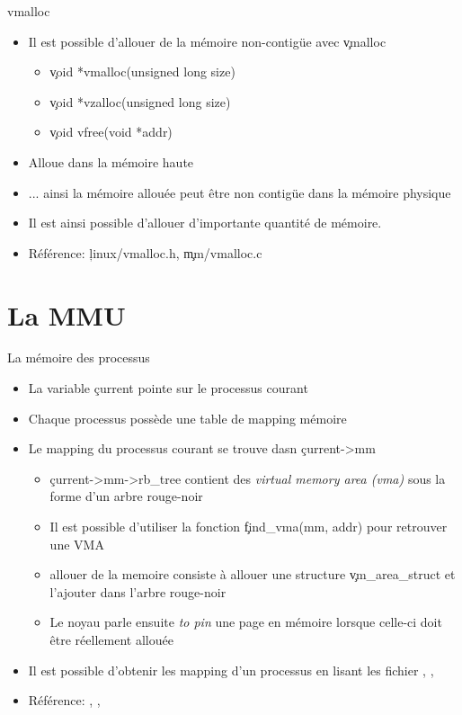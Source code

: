 \begin{frame}[fragile=singleslide]{vmalloc}
  \begin{itemize} 
  \item Il est possible d'allouer de la mémoire non-contigüe avec
    \c{vmalloc}
    \begin{itemize} 
    \item \c{void *vmalloc(unsigned long size)}
    \item \c{void *vzalloc(unsigned long size)}
    \item \c{void vfree(void *addr)}
    \end{itemize} 
  \item Alloue dans la mémoire haute
  \item ...  ainsi la mémoire allouée  peut être non  contigüe dans la
    mémoire physique
  \item  Il  est ainsi  possible  d'allouer  d'importante quantité  de
    mémoire.
  \item Référence: \c{linux/vmalloc.h}, \c{mm/vmalloc.c}
  \end{itemize} 
\end{frame}

\section{La MMU}

\begin{frame}[fragile=singleslide]{La mémoire des processus}
  \begin{itemize} 
  \item La variable \c{current} pointe sur le processus courant
  \item Chaque processus possède une table de mapping mémoire
  \item Le mapping du processus courant se trouve dasn \c{current->mm}
    \begin{itemize} 
    \item  \c{current->mm->rb_tree} contient des  \emph{virtual memory
        area (vma)} sous la forme d'un arbre rouge-noir
    \item     Il    est     possible     d'utiliser    la     fonction
      \c{find_vma(mm, addr)} pour retrouver une VMA
    \item  allouer de  la  memoire consiste  à  allouer une  structure
      \c{vm_area_struct} et l'ajouter dans l'arbre rouge-noir
    \item Le  noyau parle  ensuite \emph{to pin}  une page  en mémoire
      lorsque celle-ci doit être réellement allouée
    \end{itemize} 
  \item Il est possible d'obtenir les mapping d'un processus en lisant
    les   fichier   ,   ,
  \item         Référence:        ,
    , 
  \end{itemize} 
\end{frame} 


